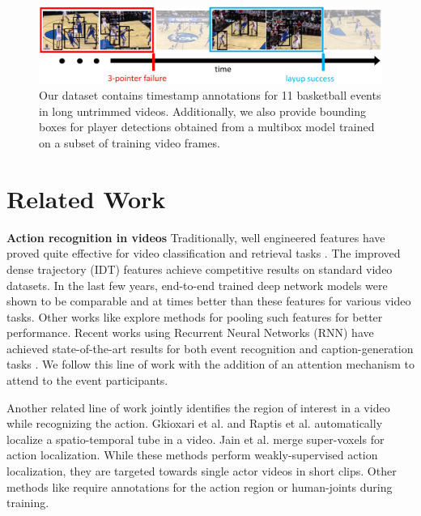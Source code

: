 
\begin{figure}[ht!]
  \includegraphics[width=6.5 in]{images/dataset_figure_cropped.pdf}
  \caption{Our dataset contains timestamp annotations for 11 basketball events
    in long untrimmed videos. Additionally, we also provide bounding boxes for player
    detections obtained from a multibox model trained on a subset of training
  video frames.}
\end{figure}



\section{Related Work}

\noindent \textbf{Action recognition in videos}
Traditionally, well engineered features have proved quite effective for video
classification and retrieval tasks
\cite{Dalal_ECCV06,Jain_CVPR13,Jiang_ECCV12,Laptev_CVPR08,
Niebels_ECCV10,Oh_MVA14,Oneata_ICCV13,Peng_ECCV14,Sadanand_CVPR12,Schuldt_ICPR04,Wang_BMVC09,Wang_CVPR11}.
The improved dense trajectory (IDT) features \cite{Wang_CVPR11} achieve
competitive results on standard video datasets.  In the last few years,
end-to-end trained deep network models
\cite{Ji_PAMI13,Karpathy_CVPR14,Simonyan_2014,Simonyan_NIPS14,Tran_arxiv14} were shown to be comparable and
at times better than these features for various video tasks.  Other works like
\cite{Wang_arxiv15,Xu_2015,Zha_2015} explore methods for pooling such
features for better performance. Recent works using Recurrent Neural Networks (RNN) have achieved
state-of-the-art results for both event recognition and caption-generation
tasks \cite{Donahue_arxiv14,Ng_arxiv15,Srivastava_2015,Yao_arxiv15}.
We follow this line of work with the addition of an attention mechanism
to attend to the event participants.

Another related line of work jointly identifies the region of interest in a video
while recognizing the action.
Gkioxari et al.  \cite{Gkioxari_arxiv14} and Raptis et al.  \cite{Raptis_CVPR12}
automatically localize a spatio-temporal tube in a video.
Jain et al. \cite{Jain_CVPR14} merge super-voxels for action localization.
While these methods perform weakly-supervised action localization, they are targeted
towards single actor videos in short clips.
Other methods like \cite{Lan_ICCV11,Prest_PAMI13,Tian_CVPR13,Wang_ECCV14} require annotations
for the action region or human-joints during training.

